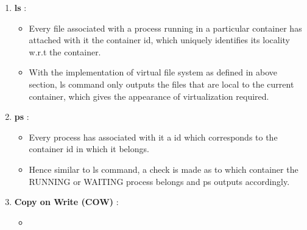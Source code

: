 \begin{enumerate}
    \item \textbf{ls }:
        \begin{itemize}
            \item Every file associated with a process running in a particular container has attached with it the container id, which uniquely identifies its locality w.r.t the container.
            \item With the implementation of virtual file system as defined in above section, ls command only outputs the files that are local to the current container, which gives the appearance of virtualization required.
        \end{itemize}
    \item \textbf{ps }:
        \begin{itemize}
            \item Every process has associated with it a id which corresponds to the container id in which it belongs.
            \item Hence similar to ls command, a check is made as to which container the RUNNING or WAITING process belongs and ps outputs accordingly.
        \end{itemize}
    \item  \textbf{Copy on Write (COW) }:
        \begin{itemize}
            \item 
        \end{itemize}
\end{enumerate}